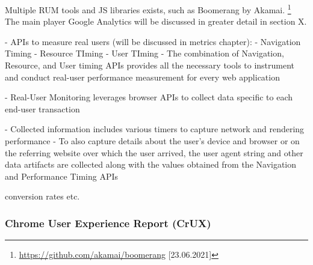 
Multiple RUM tools and JS libraries exists, such as Boomerang by Akamai. \footnote{\url{https://github.com/akamai/boomerang} [23.06.2021]}
The main player Google Analytics will be discussed in greater detail in section X.






- APIs to measure real users (will be discussed in metrics chapter):
- Navigation Timing
- Resource TIming
- User TIming
- The combination of Navigation, Resource, and User timing APIs provides all the necessary tools to instrument and conduct real-user performance measurement for every web application

- Real-User Monitoring leverages browser APIs to collect data specific to each end-user transaction

- Collected information includes various timers to capture network and rendering performance
- To also capture details about the user’s device and browser or on the referring website over which the user arrived, the user agent string and other data artifacts are collected along with the values obtained from the Navigation and Performance Timing APIs


conversion rates etc.













\subsubsection{Chrome User Experience Report (CrUX)}


